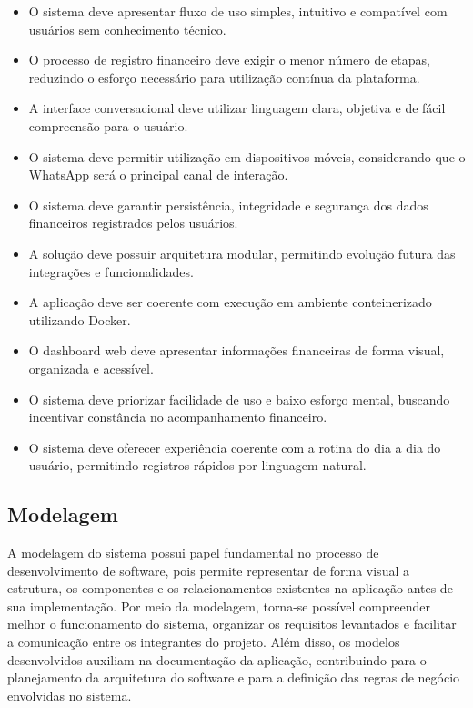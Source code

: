 \begin{itemize}
    \item O sistema deve apresentar fluxo de uso simples, intuitivo e compatível com usuários sem conhecimento técnico.
    \item O processo de registro financeiro deve exigir o menor número de etapas, reduzindo o esforço necessário para utilização contínua da plataforma.
    \item A interface conversacional deve utilizar linguagem clara, objetiva e de fácil compreensão para o usuário.
    \item O sistema deve permitir utilização em dispositivos móveis, considerando que o WhatsApp será o principal canal de interação.
    \item O sistema deve garantir persistência, integridade e segurança dos dados financeiros registrados pelos usuários.
    \item A solução deve possuir arquitetura modular, permitindo evolução futura das integrações e funcionalidades.
    \item A aplicação deve ser coerente com execução em ambiente conteinerizado utilizando Docker.
    \item O dashboard web deve apresentar informações financeiras de forma visual, organizada e acessível.
    \item O sistema deve priorizar facilidade de uso e baixo esforço mental, buscando incentivar constância no acompanhamento financeiro.
    \item O sistema deve oferecer experiência coerente com a rotina do dia a dia do usuário, permitindo registros rápidos por linguagem natural.
\end{itemize}

\subsection{Modelagem}

A modelagem do sistema possui papel fundamental no processo de desenvolvimento de software, pois permite representar de forma visual a estrutura, os componentes e os relacionamentos existentes na aplicação antes de sua implementação. Por meio da modelagem, torna-se possível compreender melhor o funcionamento do sistema, organizar os requisitos levantados e facilitar a comunicação entre os integrantes do projeto. Além disso, os modelos desenvolvidos auxiliam na documentação da aplicação, contribuindo para o planejamento da arquitetura do software e para a definição das regras de negócio envolvidas no sistema.

